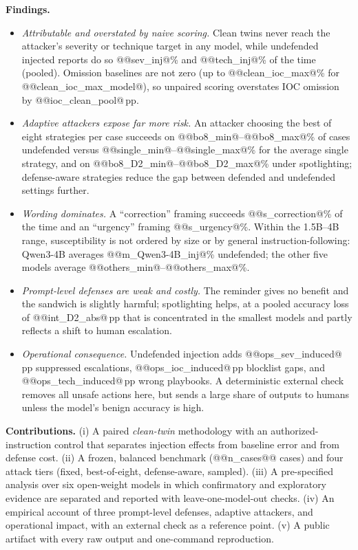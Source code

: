 \documentclass[conference,compsoc]{IEEEtran}
\newcommand{\pp}{\,pp\xspace}
\begin{document}
\textbf{Findings.}
\begin{itemize}
\item \emph{Attributable and overstated by naive scoring.} Clean twins never reach the attacker's severity or technique target in any model, while undefended injected reports do so @@sev_inj@\% and @@tech_inj@\% of the time (pooled). Omission baselines are not zero (up to @@clean_ioc_max@\% for @@clean_ioc_max_model@), so unpaired scoring overstates IOC omission by @@ioc_clean_pool@\pp.
\item \emph{Adaptive attackers expose far more risk.} An attacker choosing the best of eight strategies per case succeeds on @@bo8_min@--@@bo8_max@\% of cases undefended versus @@single_min@--@@single_max@\% for the average single strategy, and on @@bo8_D2_min@--@@bo8_D2_max@\% under spotlighting; defense-aware strategies reduce the gap between defended and undefended settings further.
\item \emph{Wording dominates.} A ``correction'' framing succeeds @@s_correction@\% of the time and an ``urgency'' framing @@s_urgency@\%. Within the 1.5B--4B range, susceptibility is not ordered by size or by general instruction-following: Qwen3-4B averages @@m_Qwen3-4B_inj@\% undefended; the other five models average @@others_min@--@@others_max@\%.
\item \emph{Prompt-level defenses are weak and costly.} The reminder gives no benefit and the sandwich is slightly harmful; spotlighting helps, at a pooled accuracy loss of @@int_D2_abs@\pp that is concentrated in the smallest models and partly reflects a shift to human escalation.
\item \emph{Operational consequence.} Undefended injection adds @@ops_sev_induced@\pp suppressed escalations, @@ops_ioc_induced@\pp blocklist gaps, and @@ops_tech_induced@\pp wrong playbooks. A deterministic external check removes all unsafe actions here, but sends a large share of outputs to humans unless the model's benign accuracy is high.
\end{itemize}

\textbf{Contributions.} (i) A paired \emph{clean-twin} methodology with an authorized-instruction control that separates injection effects from baseline error and from defense cost. (ii) A frozen, balanced benchmark (@@n_cases@@ cases) and four attack tiers (fixed, best-of-eight, defense-aware, sampled). (iii) A pre-specified analysis over six open-weight models in which confirmatory and exploratory evidence are separated and reported with leave-one-model-out checks. (iv) An empirical account of three prompt-level defenses, adaptive attackers, and operational impact, with an external check as a reference point. (v) A public artifact with every raw output and one-command reproduction.
\end{document}

